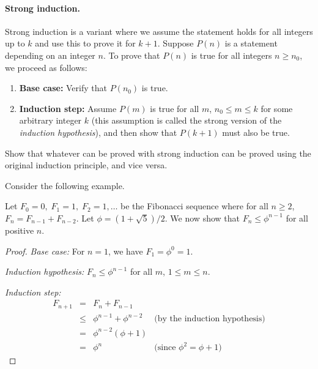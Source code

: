 \paragraph{Strong induction.} Strong induction is a variant where we assume the statement holds for  all integers up to $k$ and use this to prove it for $k+1$. Suppose $P(n)$ is a statement depending on an integer $n$. To prove that 
$P(n)$ is true for all integers $n \geq n_0$, we proceed as follows:
\begin{enumerate}
    \item \textbf{Base case:} Verify that $P(n_0)$ is true.
    \item \textbf{Induction step:} Assume $P(m)$ is true for all $m$, $n_0 \leq m \leq k$   for some arbitrary 
          integer $k$ (this assumption is called the strong version of the \emph{induction hypothesis}), 
          and then show that $P(k+1)$ must also be true.
\end{enumerate}


\begin{exercise}
Show that whatever can be proved with strong induction can be proved using the original induction principle, and vice versa.
\end{exercise}

Consider the following example.

\begin{theorem}
Let $F_0  = 0,\; F_1  = 1, \;F_2  = 1, \ldots$ be the  Fibonacci  sequence  where 
for all $n \geq 2$, $F_n =  F_{n-1}    + F_{n-2}$.  Let  
$\phi  = (1 + \sqrt{5})/2$.  We  now  show  that 
$F_n \leq \phi^{n-1}$   for all positive $n$.
\end{theorem}

\noindent
\begin{proof}

\noindent
\emph{Base case:} For $n = 1$, we have $F_1  = \phi^0  = 1$.

\noindent
\emph{Induction hypothesis:}  $F_n \leq \phi^{n-1}$  for all $m$, $1 \leq m \leq n$.

\noindent
\emph{Induction step:}
\[
        \begin{array}{llll}
                 F_{n+1} &  = & F_n  + F_{n-1} \\
                         & \leq & \phi^{n-1} + \phi^{n-2} & \mbox{(by the induction hypothesis)} \\
                         & = & \phi^{n-2}(\phi + 1) \\ 
                         & = & \phi^n & \mbox{(since $\phi^2 = \phi + 1$)}
        \end{array}
\]
\end{proof}

